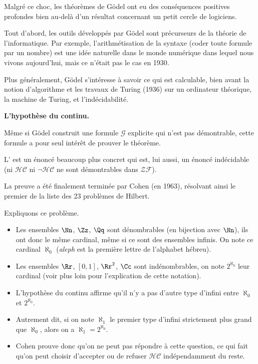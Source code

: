 \documentclass[11pt,class=report,crop=false]{standalone}
\begin{document}
\bigskip

Malgré ce choc, les théorèmes de Gödel ont eu des conséquences positives profondes bien au-delà d'un résultat concernant un petit cercle de logiciens. 

Tout d'abord, les outils développés par Gödel sont précurseurs de la théorie de l'informatique. Par exemple, l'arithmétisation de la syntaxe (coder toute formule par un nombre) est une idée naturelle dans le monde numérique dans lequel nous vivons aujourd'hui, mais ce n'était pas le cas en 1930.

Plus généralement, Gödel s'intéresse à savoir ce qui est calculable, bien avant la notion d'algorithme et les travaux de Turing (1936) sur un ordinateur théorique, la machine de Turing, et l'indécidabilité.


\bigskip


\textbf{L'hypothèse du continu.} 

Même si Gödel construit une formule $\mathcal{G}$ explicite qui n'est pas démontrable, cette formule a pour seul intérêt de prouver le théorème.

L' est un énoncé beaucoup plus concret qui est, lui aussi, un énoncé indécidable (ni $\mathcal{HC}$ ni $\lnot\mathcal{HC}$ ne sont démontrables dans $\mathcal{ZF}$).

La preuve a été finalement terminée par Cohen (en 1963), résolvant ainsi le premier de la liste des 23 problèmes de Hilbert.

Expliquons ce problème.
\begin{itemize}
    \item Les ensembles $\Nn$, $\Zz$, $\Qq$ sont dénombrables (en bijection avec $\Nn$), ils ont donc le même cardinal, même si ce sont des ensembles infinis.
    On note ce cardinal $\aleph_0$ (\emph{aleph} est la première lettre de l'alphabet hébreu).

    \item Les ensembles $\Rr$, $[0,1]$, $\Rr^2$, $\Cc$ sont indénombrables, on note $2^{\aleph_0}$ leur cardinal (voir plus loin pour l'explication de cette notation).
    
    \item L'hypothèse du continu affirme qu'il n'y a pas d'autre type d'infini entre $\aleph_0$ et $2^{\aleph_0}$.

    \item Autrement dit, si on note $\aleph_1$ le premier type d'infini strictement plus grand que $\aleph_0$, alors on a $\aleph_1 = 2^{\aleph_0}$.
    
    \item Cohen prouve donc qu'on ne peut pas répondre à cette question, ce qui fait qu'on peut choisir d'accepter ou de refuser $\mathcal{HC}$ indépendamment du reste.
\end{itemize}
\end{document}
